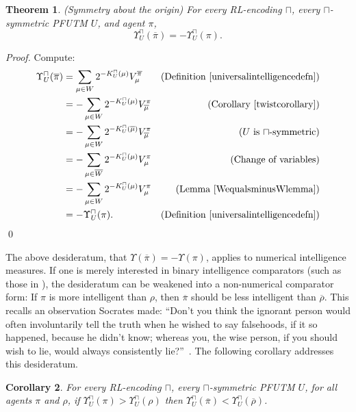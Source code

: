 \documentclass[runningheads]{llncs}
\newtheorem{mytheorem}{Theorem}
\newtheorem{mycorollary}[mytheorem]{Corollary}
\def\LH{\Upsilon}
\begin{document}
\begin{mytheorem}
\label{maintheorem}
(Symmetry about the origin)
    For every RL-encoding $\sqcap$,
    every $\sqcap$-symmetric PFUTM $U$, and agent $\pi$,
    \[
        \LH^\sqcap_U(\overline\pi) = -\LH^\sqcap_U(\pi).
    \]
\end{mytheorem}

\begin{proof}
    Compute:
    \begin{align*}
        \LH^\sqcap_U(\overline\pi) &= \sum_{\mu\in W} 2^{-K^\sqcap_U(\mu)}V^{\overline\pi}_\mu
            &\mbox{(Definition \ref{universalintelligencedefn})}\\
          &= -\sum_{\mu\in W} 2^{-K^\sqcap_U(\mu)}V^\pi_{\overline\mu}
            &\mbox{(Corollary \ref{twistcorollary})}\\
          &= -\sum_{\mu\in W} 2^{-K^\sqcap_U(\overline\mu)}V^\pi_{\overline\mu}
            &\mbox{($U$ is $\sqcap$-symmetric)}\\
          &= -\sum_{\mu\in \overline W} 2^{-K^\sqcap_U(\mu)}V^\pi_\mu
            &\mbox{(Change of variables)}\\
          &= -\sum_{\mu\in W} 2^{-K^\sqcap_U(\mu)}V^\pi_\mu
            &\mbox{(Lemma \ref{WequalsminusWlemma})}\\
          &= -\LH^\sqcap_{U}(\pi).
            &\mbox{(Definition \ref{universalintelligencedefn})}
    \end{align*}
    \qed
\end{proof}

The above desideratum, that $\Upsilon(\overline\pi)=-\Upsilon(\pi)$, applies to
numerical intelligence measures. If one is merely interested in binary
intelligence comparators (such as those in \cite{alexander2019intelligence}),
the desideratum can be weakened into a non-numerical comparator form:
    If $\pi$ is more intelligent than $\rho$,
    then $\overline\pi$ should be less intelligent than $\overline\rho$.
This recalls an observation Socrates made:
``Don't you think the ignorant person would often involuntarily
tell the truth when he wished to say falsehoods, if it so happened, because he
didn't know; whereas you, the wise person, if you should wish to lie,
would always consistently lie?''\ \cite{lesserhippias}.
The following corollary addresses this desideratum.

\begin{mycorollary}
\label{comparatorcorollary}
    For every RL-encoding $\sqcap$, every $\sqcap$-symmetric PFUTM $U$,
    for all agents $\pi$ and $\rho$, if $\LH^\sqcap_U(\pi)>\LH^\sqcap_U(\rho)$
    then $\LH^\sqcap_U(\overline\pi)<\LH^\sqcap_U(\overline\rho)$.
\end{mycorollary}
\end{document}
